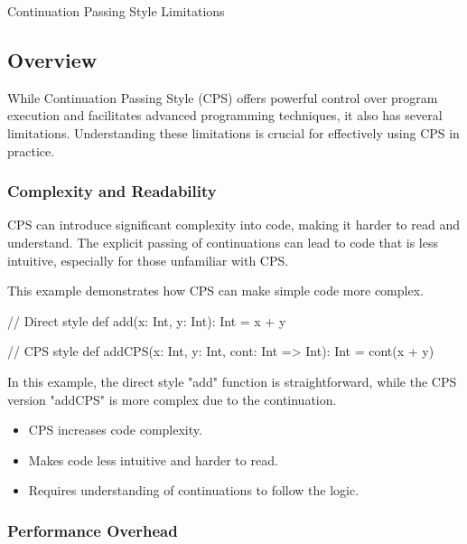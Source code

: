 \begin{notes}{Continuation Passing Style Limitations}
    \subsection*{Overview}

    While Continuation Passing Style (CPS) offers powerful control over program execution and facilitates advanced programming techniques, it also has several limitations. Understanding these 
    limitations is crucial for effectively using CPS in practice.
    
    \subsubsection*{Complexity and Readability}
    
    CPS can introduce significant complexity into code, making it harder to read and understand. The explicit passing of continuations can lead to code that is less intuitive, especially for 
    those unfamiliar with CPS.
    
    \begin{highlight}
    
        This example demonstrates how CPS can make simple code more complex.
    
    \begin{code}[Scala]
    // Direct style
    def add(x: Int, y: Int): Int = x + y
    
    // CPS style
    def addCPS(x: Int, y: Int, cont: Int => Int): Int = cont(x + y)
    \end{code}
    
        In this example, the direct style "add" function is straightforward, while the CPS version "addCPS" is more complex due to the continuation.
    
        \begin{itemize}
            \item CPS increases code complexity.
            \item Makes code less intuitive and harder to read.
            \item Requires understanding of continuations to follow the logic.
        \end{itemize}
    
    \end{highlight}
    
    \subsubsection*{Performance Overhead}
    

\end{notes}
